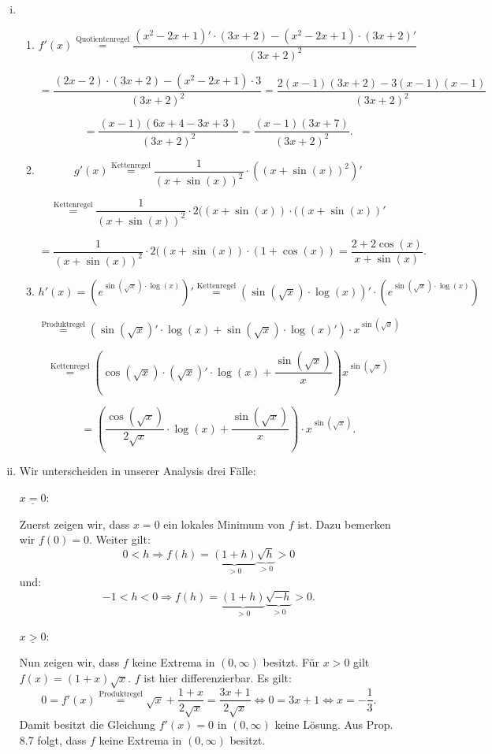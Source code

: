 \documentclass[a4paper, 20]{exam}
\begin{document}
\begin{solution}
\begin{enumerate}[i.)]
\item
\begin{enumerate}
\item
$$ f'(x) 
\stackrel{\text{Quotientenregel}}{=} \frac{(x^2-2x+1)' \cdot (3x+2) - (x^2-2x+1)\cdot (3x+2)'}{(3x+2)^2}$$

$$ =\frac{(2x-2) \cdot (3x+2) - (x^2-2x+1)\cdot 3}{(3x+2)^2} 
= \frac{2(x-1)(3x+2) -3(x-1)(x-1)}{(3x+2)^2}$$

$$= \frac{(x-1)(6x+4 -3x+3)}{(3x+2)^2}
= \frac{(x-1)(3x+7)}{(3x+2)^2}.$$
\item
$$g'(x) \stackrel{\text{Kettenregel}}{=} \frac{1}{(x + \sin(x))^2} \cdot \left( (x + \sin(x))^2 \right)'$$

$$\stackrel{\text{Kettenregel}}{=} \frac{1}{(x + \sin(x))^2} \cdot 2( (x + \sin(x))\cdot ( (x + \sin(x))'$$

$$=\frac{1}{(x + \sin(x))^2} \cdot 2( (x + \sin(x))\cdot ( 1+\cos(x))
= \frac{2+2\cos(x)}{ x + \sin(x) }.$$
\item
$$ h'(x) = \left( e^{\sin(\sqrt{x})\cdot \log(x)} \right)' 
\stackrel{\text{Kettenregel}}{=} \left( \sin(\sqrt{x})\cdot \log(x) \right)' \cdot \left( e^{\sin(\sqrt{x})\cdot \log(x)} \right)$$

$$\stackrel{\text{Produktregel}}{=} \left( \sin(\sqrt{x})' \cdot \log(x) + \sin(\sqrt{x}) \cdot \log(x)' \right) \cdot x^{\sin(\sqrt{x})}$$

$$\stackrel{\text{Kettenregel}}{=} \left(\cos(\sqrt{x})\cdot \left( \sqrt{x} \right)' \cdot \log(x) + \frac{\sin(\sqrt{x})}{x}\right) x^{\sin(\sqrt{x})}$$

$$= \left( \frac{\cos(\sqrt{x})}{2\sqrt{x}}\cdot \log(x) + \frac{\sin(\sqrt{x})}{x} \right) \cdot x^{\sin(\sqrt{x})}.$$
\end{enumerate}
\item
Wir unterscheiden in unserer Analysis drei F\"alle:

$\underline{x=0}$:

Zuerst zeigen wir, dass $x=0$ ein lokales Minimum von $f$ ist. Dazu bemerken wir $f(0)=0$. Weiter gilt:
$$ 0<h \Longrightarrow f(h) = \underbrace{(1+h)}_{>0} \underbrace{\sqrt{h}}_{>0} >0$$
und:
$$ -1<h<0 \Longrightarrow f(h) = \underbrace{(1+h)}_{>0} \underbrace{\sqrt{-h}}_{>0} >0.$$

$\underline{x>0}$:

Nun zeigen wir, dass $f$ keine Extrema in $(0, \infty)$ besitzt. F\"ur $x>0$ gilt $f(x)=(1+x)\sqrt{x}$. $f$ ist hier differenzierbar. Es gilt:
$$ 0=f'(x) \stackrel{\text{Produktregel}}{=} \sqrt{x} + \frac{1+x}{2\sqrt{x}} = \frac{3x+1}{2\sqrt{x}}
\Longleftrightarrow 0=  3x + 1 \Longleftrightarrow x= -\frac{1}{3}.$$
Damit besitzt die Gleichung $f'(x)=0$ in $(0, \infty)$ keine L\"osung. Aus Prop. 8.7 folgt, dass $f$ keine Extrema in $(0, \infty)$ besitzt.


\end{enumerate}
\end{solution}
\end{document}
